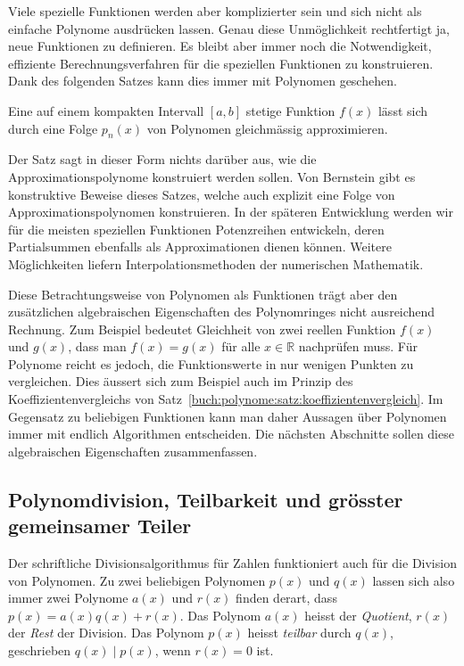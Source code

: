 Viele spezielle Funktionen werden aber komplizierter sein und
sich nicht als einfache Polynome ausdrücken lassen.
Genau diese Unmöglichkeit rechtfertigt ja, neue Funktionen
zu definieren.
Es bleibt aber immer noch die Notwendigkeit, effiziente 
Berechnungsverfahren für die speziellen Funktionen zu konstruieren.
Dank des folgenden Satzes kann dies immer mit Polynomen geschehen.

\begin{satz}[Weierstrass]
\label{buch:potenzen:satz:weierstrass}
%
Eine auf einem kompakten Intervall $[a,b]$ stetige Funktion $f(x)$
lässt sich durch eine Folge $p_n(x)$ von Polynomen gleichmässig
approximieren.
\end{satz}

Der Satz sagt in dieser Form nichts darüber aus, wie die
Approximationspolynome konstruiert werden sollen.
Von Bernstein gibt es konstruktive Beweise dieses Satzes,
welche auch explizit eine Folge von Approximationspolynomen
konstruieren.
In der späteren Entwicklung werden wir für die meisten
speziellen Funktionen Potenzreihen entwickeln, deren Partialsummen
ebenfalls als Approximationen dienen können.
Weitere Möglichkeiten liefern Interpolationsmethoden der
numerischen Mathematik.

Diese Betrachtungsweise von Polynomen als Funktionen trägt
aber den zusätzlichen algebraischen Eigenschaften des Polynomringes
nicht ausreichend Rechnung.
Zum Beispiel bedeutet Gleichheit von zwei reellen Funktion $f(x)$ und
$g(x)$, dass man $f(x)=g(x)$ für alle $x\in\mathbb{R}$ nachprüfen
muss.
Für Polynome reicht es jedoch, die Funktionswerte in nur wenigen
Punkten zu vergleichen.
Dies äussert sich zum Beispiel auch im Prinzip des
Koeffizientenvergleichs von
Satz~\ref{buch:polynome:satz:koeffizientenvergleich}.
Im Gegensatz zu beliebigen Funktionen kann man daher Aussagen
über Polynomen immer mit endlich Algorithmen entscheiden.
Die nächsten Abschnitte sollen diese algebraischen Eigenschaften
zusammenfassen.

%
%
\subsection{Polynomdivision, Teilbarkeit und grösster gemeinsamer Teiler}
Der schriftliche Divisionsalgorithmus für Zahlen funktioniert 
auch für die Division von Polynomen.
%
Zu zwei beliebigen Polynomen $p(x)$ und $q(x)$ lassen sich also
immer zwei Polynome $a(x)$ und $r(x)$ finden derart, dass
$p(x) = a(x) q(x) + r(x)$.
Das Polynom $a(x)$ heisst der {\em Quotient}, $r(x)$ der {\em Rest}
der Division.
Das Polynom $p(x)$ heisst {\em teilbar} durch $q(x)$, geschrieben
%
%
$q(x)\mid p(x)$, wenn $r(x)=0$ ist.

